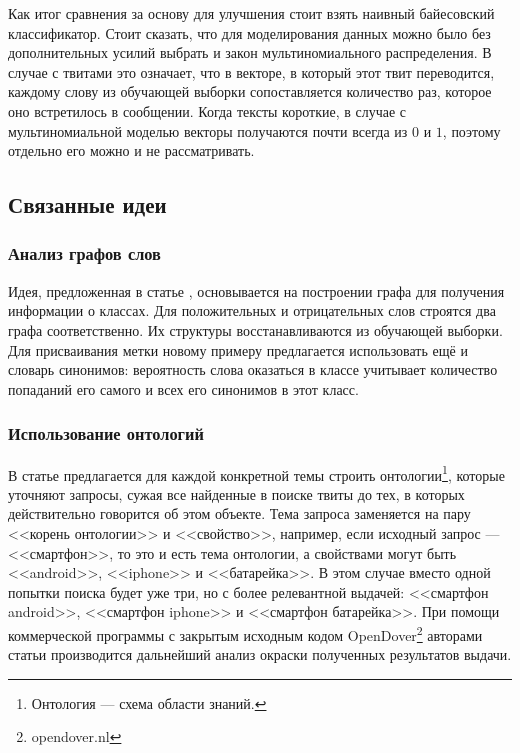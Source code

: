Как итог сравнения за основу для улучшения стоит взять наивный байесовский классификатор. Стоит
сказать, что для моделирования данных можно было без дополнительных усилий выбрать
и закон мультиномиального распределения. В случае с твитами это означает, что в векторе, в который этот твит
переводится, каждому слову из обучающей выборки сопоставляется количество раз, которое оно встретилось в сообщении. Когда тексты короткие, в случае с мультиномиальной моделью векторы
получаются почти всегда из $0$ и $1$, поэтому отдельно его можно и не рассматривать.

\subsection{Связанные идеи}

\subsubsection{Анализ графов слов}
Идея, предложенная в статье \cite{Colace2013}, основывается на построении графа для получения
информации о классах. Для положительных и отрицательных слов строятся два графа
соответственно. Их структуры восстанавливаются из обучающей выборки. Для присваивания метки новому
примеру предлагается использовать ещё и словарь синонимов: вероятность слова оказаться в классе учитывает количество
попаданий его самого и всех его синонимов в этот класс.

\subsubsection{Использование онтологий}
В статье \cite{Kontopoulos2013} предлагается для каждой конкретной темы строить
онтологии\footnote{Онтология --- схема области знаний.}, которые уточняют запросы, сужая все
найденные в поиске твиты до тех, в которых действительно говорится об этом объекте. Тема запроса заменяется на пару <<корень
онтологии>> и <<свойство>>, например, если исходный запрос --- <<смартфон>>, то
это и есть тема
онтологии, а свойствами могут быть <<android>>, <<iphone>> и <<батарейка>>. В этом случае вместо
одной попытки поиска будет уже три, но с более релевантной выдачей: <<смартфон android>>, <<смартфон
iphone>> и <<смартфон
батарейка>>. При помощи коммерческой программы с закрытым исходным кодом
OpenDover\footnote{opendover.nl} авторами статьи производится дальнейший анализ окраски полученных результатов
выдачи.

